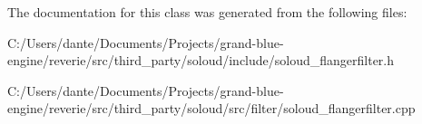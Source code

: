 The documentation for this class was generated from the following files\+:\begin{DoxyCompactItemize}
\item 
C\+:/\+Users/dante/\+Documents/\+Projects/grand-\/blue-\/engine/reverie/src/third\+\_\+party/soloud/include/soloud\+\_\+flangerfilter.\+h\item 
C\+:/\+Users/dante/\+Documents/\+Projects/grand-\/blue-\/engine/reverie/src/third\+\_\+party/soloud/src/filter/soloud\+\_\+flangerfilter.\+cpp\end{DoxyCompactItemize}
